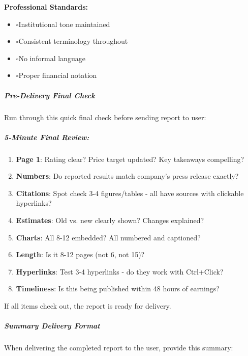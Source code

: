 \documentclass[11pt]{article}
\newcommand{\UncheckedBox}{$\square$}
\begin{document}
\textbf{Professional Standards:}

\begin{itemize}[leftmargin=*,itemsep=2pt,topsep=2pt]
\item {} \UncheckedBox Institutional tone maintained
\item {} \UncheckedBox Consistent terminology throughout
\item {} \UncheckedBox No informal language
\item {} \UncheckedBox Proper financial notation
\end{itemize}

\subparagraph{Pre-Delivery Final Check}\mbox{}\par

Run through this quick final check before sending report to user:


\subparagraph{5-Minute Final Review:}\mbox{}\par
\begin{enumerate}[leftmargin=*,itemsep=2pt,topsep=2pt]
\item {} \textbf{Page 1}: Rating clear? Price target updated? Key takeaways compelling?
\item {} \textbf{Numbers}: Do reported results match company's press release exactly?
\item {} \textbf{Citations}: Spot check 3-4 figures/tables - all have sources with clickable hyperlinks?
\item {} \textbf{Estimates}: Old vs. new clearly shown? Changes explained?
\item {} \textbf{Charts}: All 8-12 embedded? All numbered and captioned?
\item {} \textbf{Length}: Is it 8-12 pages (not 6, not 15)?
\item {} \textbf{Hyperlinks}: Test 3-4 hyperlinks - do they work with Ctrl+Click?
\item {} \textbf{Timeliness}: Is this being published within 48 hours of earnings?
\end{enumerate}

If all items check out, the report is ready for delivery.


\subparagraph{Summary Delivery Format}\mbox{}\par

When delivering the completed report to the user, provide this summary:
\end{document}
